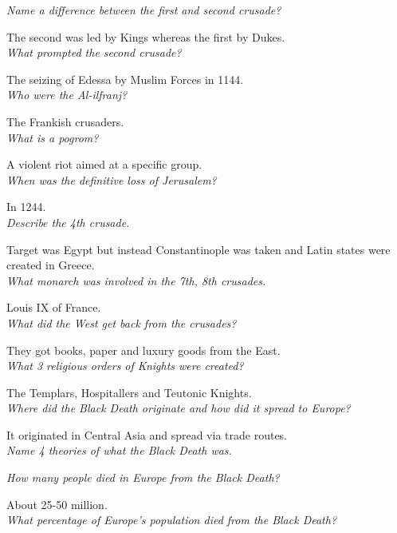\documentclass[12pt]{article}
\begin{document}
\textit{Name a difference between the first and second crusade?}

The second was led by Kings whereas the first by Dukes.\\

\textit{What prompted the second crusade?}

The seizing of Edessa by Muslim Forces in 1144. \\

\textit{Who were the Al-ilfranj?}

The Frankish crusaders.\\

\textit{What is a pogrom?}

A violent riot aimed at a specific group.\\

\textit{When was the definitive loss of Jerusalem?}

In 1244. \\

\textit{Describe the 4th crusade.}

Target was Egypt but instead Constantinople was taken and Latin states were created in Greece.\\

\textit{What monarch was involved in the 7th, 8th crusades.}

Louis IX of France.\\

\textit{What did the West get back from the crusades?}

They got books, paper and luxury goods from the East.\\

\textit{What 3 religious orders of Knights were created?}

The Templars, Hospitallers and Teutonic Knights.\\

\textit{Where did the Black Death originate and how did it spread to Europe?}

It originated in Central Asia and spread via trade routes.\\

\textit{Name 4 theories of what the Black Death was.}

\textit{How many people died in Europe from the Black Death?}

About 25-50 million.\\

\textit{What percentage of Europe's population died from the Black Death?}
\end{document}
